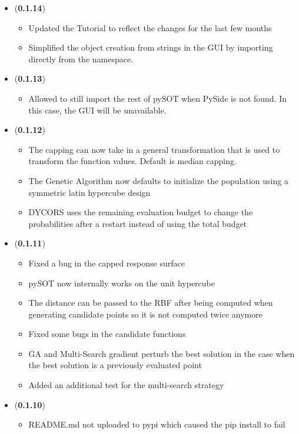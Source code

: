 \documentclass[]{article}
\begin{document}
\begin{itemize}
\item (\textbf{0.1.14}) 
\begin{itemize}
\item Updated the Tutorial to reflect the changes for the last few months
\item Simplified the object creation from strings in the GUI by importing directly from the namespace.
\end{itemize}

\item (\textbf{0.1.13}) 
\begin{itemize}
\item Allowed to still import the rest of pySOT when PySide is not found. In this case, the GUI will be unavailable.
\end{itemize}

\item (\textbf{0.1.12}) 
\begin{itemize}
\item The capping can now take in a general transformation that is used to transform the function values. Default is median capping.
\item The Genetic Algorithm now defaults to initialize the population using a symmetric latin hypercube design
\item DYCORS uses the remaining evaluation budget to change the probabilities after a restart instead of using the total budget 
\end{itemize}

\item (\textbf{0.1.11}) 
\begin{itemize}
\item Fixed a bug in the capped response surface
\item pySOT now internally works on the unit hypercube
\item The distance can be passed to the RBF after being computed when generating candidate points so it is not computed twice anymore
\item Fixed some bugs in the candidate functions
\item GA and Multi-Search gradient perturb the best solution in the case when the best solution is a previously evaluated point
\item Added an additional test for the multi-search strategy
\end{itemize}

\item (\textbf{0.1.10}) 
\begin{itemize}
\item README.md not uploaded to pypi which caused the pip install to fail
\end{itemize}


\end{itemize}
\end{document}
